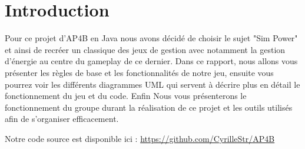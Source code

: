 \section*{Introduction}

Pour ce projet d’AP4B en Java nous avons décidé de choisir le sujet "Sim Power" et ainsi
de recréer un classique des jeux de gestion avec notamment la gestion d’énergie au centre du gameplay de ce dernier.
Dans ce rapport, nous allons vous présenter les règles de base et les fonctionnalités de notre jeu, ensuite vous pourrez voir les différents diagrammes UML qui servent à décrire plus en détail le fonctionnement du jeu et du code. Enfin Nous vous présenterons le fonctionnement du groupe durant la réalisation de ce projet et les outils utilisés afin de s’organiser efficacement.

Notre code source est disponible ici : \url{https://github.com/CyrilleStr/AP4B}
